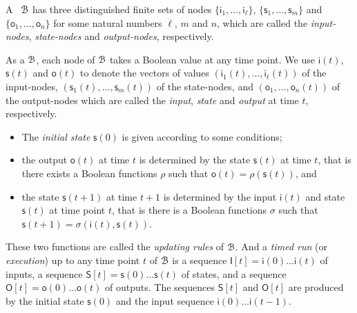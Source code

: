 A \BCN\  ${\mathcal{B}}$ has three distinguished finite sets of nodes $\{\mathsf{i}_1,\ldots, \mathsf{i}_\ell\}$, $\{\mathsf{s}_1,\ldots,\mathsf{s}_m\}$ and $\{\mathsf{o}_1,\ldots, \mathsf{o}_n\}$ for some natural numbers $\ell$, $m$ and $n$, which are called the {\em input-nodes}, {\em state-nodes}  and {\em output-nodes}, respectively. 

As a {\BCN} ${\mathcal{B}}$, each node of   ${\mathcal{B}}$   takes a Boolean value at any time point. We use $\mathsf{i}(t)$, $\mathsf{s}(t)$ and $\mathsf{o}(t)$  to denote the vectors of values $(\mathsf{i}_1(t),\ldots,\mathsf{i}_\ell(t))$ of the input-nodes,  $(\mathsf{s}_1(t),\ldots,\mathsf{s}_m(t))$ of the state-nodes, and $(\mathsf{o}_1,\ldots,\mathsf{o}_n(t))$ of the output-nodes  which are called the {\em input}, {\em state} and {\em output} at time $t$, respectively.
\begin{itemize}
\item The {\em initial state} $\mathsf{s}(0)$ is given according to some conditions;
	\item the output $\mathsf{o}(t)$ at time $t$ is determined by the state $\mathsf{s}(t)$ at time $t$, that is there exists a Boolean functions $\rho$ such that $\mathsf{o}(t)=\rho(\mathsf{s}(t))$, and  
	\item the state $\mathsf{s}(t+1)$ at time $t+1$ is determined by the input $\mathsf{i}(t)$ and state $\mathsf{s}(t)$ at time point $t$, that is there is a Boolean functions $\sigma$ such that $\mathsf{s}(t+1)=\sigma(\mathsf{i}(t),\mathsf{s}(t))$.
\end{itemize} 

These two functions are called the {\em updating rules} of ${\mathcal{B}}$. And a {\em timed run}  (or {\em execution}) up to any time point $t$ of ${\mathcal{B}}$ is a sequence $\mathsf{I}[t] = \mathsf{i}(0)\ldots \mathsf{i}(t)$ of inputs, a sequence $\mathsf{S}[t] = \mathsf{s}(0)\ldots \mathsf{s}(t)$ of states, and a sequence $\mathsf{O}[t] = \mathsf{o}(0)\ldots \mathsf{o}(t)$  of outputs. The sequences $\mathsf{S}[t]$ and $\mathsf{O}[t]$ are produced by the initial state $\mathsf{s}(0)$ and the input sequence $\mathsf{i}(0)\ldots \mathsf{i}(t-1)$.


 
